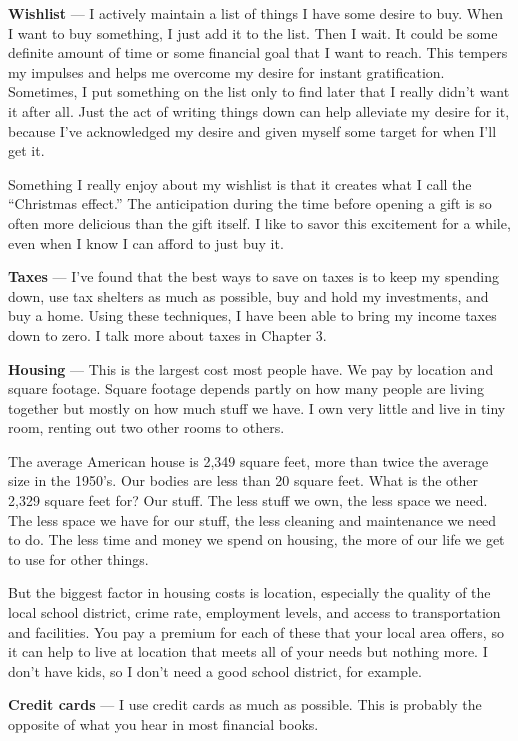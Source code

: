 \textbf{Wishlist} --- I actively maintain a list of things I have some desire to buy. When I want to buy something, I just add it to the list. Then I wait. It could be some definite amount of time or some financial goal that I want to reach. This tempers my impulses and helps me overcome my desire for instant gratification. Sometimes, I put something on the list only to find later that I really didn't want it after all. Just the act of writing things down can help alleviate my desire for it, because I've acknowledged my desire and given myself some target for when I'll get it.

Something I really enjoy about my wishlist is that it creates what I call the ``Christmas effect.'' The anticipation during the time before opening a gift is so often more delicious than the gift itself. I like to savor this excitement for a while, even when I know I can afford to just buy it.

\textbf{Taxes} --- I've found that the best ways to save on taxes is to keep my spending down, use tax shelters as much as possible, buy and hold my investments, and buy a home. Using these techniques, I have been able to bring my income taxes down to zero. I talk more about taxes in Chapter 3.

\textbf{Housing} --- This is the largest cost most people have. We pay by location and square footage. Square footage depends partly on how many people are living together but mostly on how much stuff we have. I own very little and live in tiny room, renting out two other rooms to others.

The average American house is 2,349 square feet, more than twice the average size in the 1950's.\cite{npr-dream-house} Our bodies are less than 20 square feet. What is the other 2,329 square feet for? Our stuff. The less stuff we own, the less space we need. The less space we have for our stuff, the less cleaning and maintenance we need to do. The less time and money we spend on housing, the more of our life we get to use for other things.

But the biggest factor in housing costs is location, especially the quality of the local school district, crime rate, employment levels, and access to transportation and facilities. You pay a premium for each of these that your local area offers, so it can help to live at location that meets all of your needs but nothing more. I don't have kids, so I don't need a good school district, for example.

\textbf{Credit cards} --- I use credit cards as much as possible. This is probably the opposite of what you hear in most financial books.


